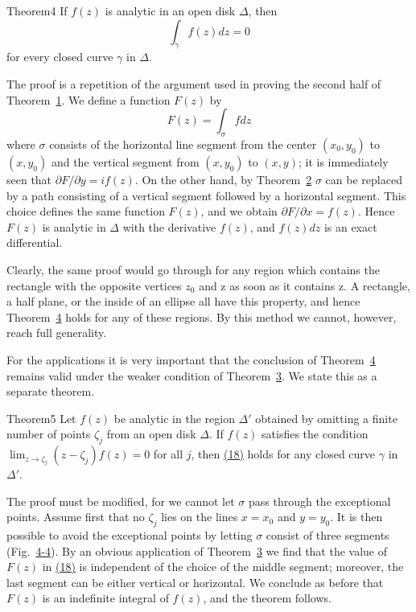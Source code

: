 \begin{originalstatement}{Theorem}{4}\label{thm:4.4}
If $f(z)$ is analytic in an open disk $\Delta$, then
\begin{equation*}
\int_ {\gamma} f (z) d z = 0\tag{18}\label{eq:4.18}
\end{equation*}
for every closed curve $\gamma$ in $\Delta$.

\end{originalstatement}
The proof is a repetition of the argument used in proving the second half of Theorem~\hyperref[thm:4.1]{1}. We define a function $F(z)$ by
\begin{equation*}
F (z) = \int_ {\sigma} f d z\tag{19}\label{eq:4.19}
\end{equation*}
where $\sigma$ consists of the horizontal line segment from the center $(x_{0},y_{0})$ to $(x,y_{0})$ and the vertical segment from $(x,y_{0})$ to $(x,y)$; it is immediately seen that $\partial F/\partial y = if(z)$. On the other hand, by Theorem~\hyperref[thm:4.2]{2} $\sigma$ can be replaced by a path consisting of a vertical segment followed by a horizontal segment. This choice defines the same function $F(z)$, and we obtain $\partial F/\partial x = f(z)$. Hence $F(z)$ is analytic in $\Delta$ with the derivative $f(z)$, and $f(z) dz$ is an exact differential.

Clearly, the same proof would go through for any region which contains the rectangle with the opposite vertices $z_{0}$ and z as soon as it contains z. A rectangle, a half plane, or the inside of an ellipse all have this property, and hence Theorem~\hyperref[thm:4.4]{4} holds for any of these regions. By this method we cannot, however, reach full generality.

For the applications it is very important that the conclusion of Theorem~\hyperref[thm:4.4]{4} remains valid under the weaker condition of Theorem~\hyperref[thm:4.3]{3}. We state this as a separate theorem.

\begin{originalstatement}{Theorem}{5}\label{thm:4.5}
Let $f(z)$ be analytic in the region $\Delta'$ obtained by omitting a finite number of points $\zeta_j$ from an open disk $\Delta$. If $f(z)$ satisfies the condition $\lim_{z \to \zeta_j} (z - \zeta_j)f(z) = 0$ for all $j$, then \hyperref[eq:4.18]{(18)} holds for any closed curve $\gamma$ in $\Delta'$.
\end{originalstatement}

The proof must be modified, for we cannot let $\sigma$ pass through the exceptional points. Assume first that no $\zeta_{j}$ lies on the lines $x = x_{0}$ and $y = y_{0}$. It is then possible to avoid the exceptional points by letting $\sigma$ consist of three segments (Fig.~\hyperref[fig:4-4]{4-4}). By an obvious application of Theorem~\hyperref[thm:4.3]{3} we find that the value of $F(z)$ in \hyperref[eq:4.18]{(18)} is independent of the choice of the middle segment; moreover, the last segment can be either vertical or horizontal. We conclude as before that $F(z)$ is an indefinite integral of $f(z)$, and the theorem follows.

